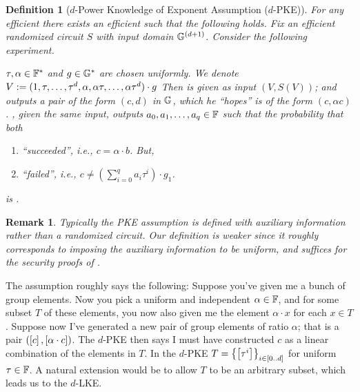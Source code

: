 \documentclass[11pt]{article}
\numberwithin{figure}{section} %
\newtheorem{dfn}[thm]{Definition}
\newtheorem{remark}[thm]{Remark}
\begin{document}
\begin{dfn}[$d$-Power Knowledge of Exponent Assumption ($d$-PKE)]\label{dfn:koeassumption}
For any efficient \adv there exists an efficient \ext such that the following holds.
Fix an efficient  randomized circuit $S$ with input domain ${\mathbb G}^{(d+1)}$.
 Consider the following experiment.

 $\tau,\alpha\in \mathbb F^*$ and $g\in {\mathbb G}^*$ are chosen uniformly. We denote $V:= (1,\tau,\ldots,\tau^{d},\alpha,\alpha \tau,\ldots,\alpha \tau^{d})\cdot g$
 Then \adv is given as input $(V,S( V))$;
 and outputs a pair of the form $(c,d)$ in ${\mathbb G}$, which he ``hopes'' is of the form $(c,\alpha c)$.
   \ext, given the same input, outputs  
 $a_0,a_1,\ldots,a_q \in \mathbb F$ such that the probability that both
   
 \begin{enumerate}
  \item \adv ``succeeded'', i.e., $c=\alpha\cdot b$. But,
  \item \ext ``failed'', i.e., $c \neq (\sum_{i=0}^q a_i \tau^i)\cdot g_1$.
   \end{enumerate}
is \neg.
\end{dfn}
\begin{remark}
Typically the PKE assumption is defined with auxiliary information rather than a randomized circuit.
Our definition is weaker since it roughly corresponds to imposing the auxiliary information to be uniform,
and suffices for the security proofs of \cite{GGPR,PHGR}.
\end{remark}
The assumption roughly says the following: Suppose you've given me a bunch of group elements. Now you pick a uniform and independent $\alpha\in\mathbb F$, and for some subset $T$ of these 
elements, you now also given me the element $\alpha\cdot x$ for each $x\in T$. Suppose now I've generated a new pair of group elements of ratio $\alpha$; that is a pair
$(\left[c\right],\left[\alpha\cdot c\right])$. The $d$-PKE then says I must have constructed $c$ as a linear combination of the elements in $T$.
In the $d$-PKE $T=\left\{\left[\tau^i\right]\right\}_{i\in[0..d]}$ for uniform $\tau\in\mathbb F$.
A natural extension would be to allow $T$ to be an arbitrary subset, which leads us to the $d$-LKE.
\end{document}
